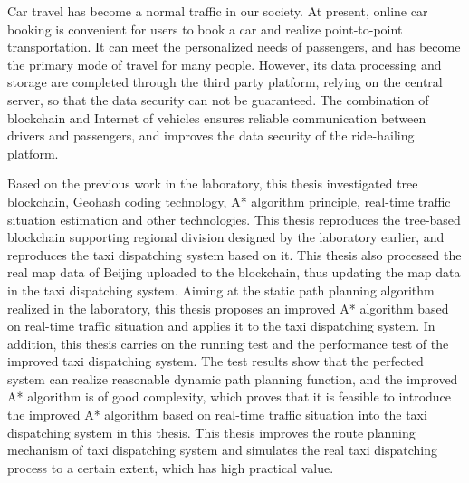 \begin{abstractEn}
Car travel has become a normal traffic in our society. At present, online car booking is convenient for users to book a car and realize point-to-point transportation. It can meet the personalized needs of passengers, and has become the primary mode of travel for many people. However, its data processing and storage are completed through the third party platform, relying on the central server, so that the data security can not be guaranteed. The combination of blockchain and Internet of vehicles ensures reliable communication between drivers and passengers, and improves the data security of the ride-hailing platform. 

Based on the previous work in the laboratory, this thesis investigated tree blockchain, Geohash coding technology, A* algorithm principle, real-time traffic situation estimation and other technologies. This thesis reproduces the tree-based blockchain supporting regional division designed by the laboratory earlier, and reproduces the taxi dispatching system based on it. This thesis also processed the real map data of Beijing uploaded to the blockchain, thus updating the map data in the taxi dispatching system. Aiming at the static path planning algorithm realized in the laboratory, this thesis proposes an improved A* algorithm based on real-time traffic situation and applies it to the taxi dispatching system. In addition, this thesis carries on the running test and the performance test of the improved taxi dispatching system. The test results show that the perfected system can realize reasonable dynamic path planning function, and the improved A* algorithm is of good complexity, which proves that it is feasible to introduce the improved A* algorithm based on real-time traffic situation into the taxi dispatching system in this thesis. This thesis improves the route planning mechanism of taxi dispatching system and simulates the real taxi dispatching process to a certain extent, which has high practical value.

\end{abstractEn}
